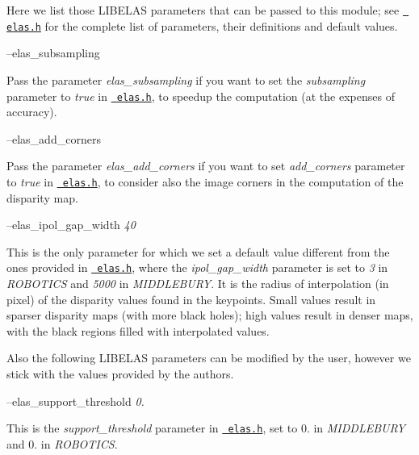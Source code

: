 Here we list those L\+I\+B\+E\+L\+AS parameters that can be passed to this module; see \href{https://github.com/robotology/stereo-vision/tree/master/lib/elas/include/elas.h}{\texttt{ elas.\+h}} for the complete list of parameters, their definitions and default values.

--elas\+\_\+subsampling
\begin{DoxyItemize}
\item Pass the parameter {\itshape elas\+\_\+subsampling} if you want to set the {\itshape subsampling} parameter to {\itshape true} in \href{https://github.com/robotology/stereo-vision/tree/master/lib/elas/include/elas.h}{\texttt{ elas.\+h}}, to speedup the computation (at the expenses of accuracy).
\end{DoxyItemize}

--elas\+\_\+add\+\_\+corners
\begin{DoxyItemize}
\item Pass the parameter {\itshape elas\+\_\+add\+\_\+corners} if you want to set {\itshape add\+\_\+corners} parameter to {\itshape true} in \href{https://github.com/robotology/stereo-vision/tree/master/lib/elas/include/elas.h}{\texttt{ elas.\+h}}, to consider also the image corners in the computation of the disparity map.
\end{DoxyItemize}

--elas\+\_\+ipol\+\_\+gap\+\_\+width {\itshape 40} 
\begin{DoxyItemize}
\item This is the only parameter for which we set a default value different from the ones provided in \href{https://github.com/robotology/stereo-vision/tree/master/lib/elas/include/elas.h}{\texttt{ elas.\+h}}, where the {\itshape ipol\+\_\+gap\+\_\+width} parameter is set to {\itshape 3} in {\itshape R\+O\+B\+O\+T\+I\+CS} and {\itshape 5000} in {\itshape M\+I\+D\+D\+L\+E\+B\+U\+RY}. It is the radius of interpolation (in pixel) of the disparity values found in the keypoints. Small values result in sparser disparity maps (with more black holes); high values result in denser maps, with the black regions filled with interpolated values.
\end{DoxyItemize}

Also the following L\+I\+B\+E\+L\+AS parameters can be modified by the user, however we stick with the values provided by the authors.

--elas\+\_\+support\+\_\+threshold {\itshape 0.} 
\begin{DoxyItemize}
\item This is the {\itshape support\+\_\+threshold} parameter in \href{https://github.com/robotology/stereo-vision/tree/master/lib/elas/include/elas.h}{\texttt{ elas.\+h}}, set to 0. in {\itshape M\+I\+D\+D\+L\+E\+B\+U\+RY} and 0. in {\itshape R\+O\+B\+O\+T\+I\+CS}.
\end{DoxyItemize}

